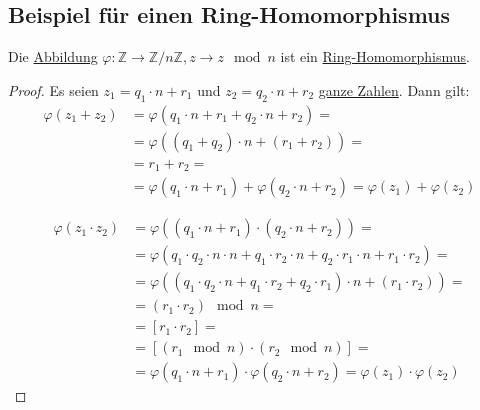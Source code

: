 \documentclass[../../main.tex]{subfiles}
\begin{document}
		\subsection*{Beispiel für einen Ring-Homomorphismus}
		\begin{theorem}
			Die \hyperref[def:Abbildung]{Abbildung} $\varphi: \mathbb{Z} \rightarrow \mathbb{Z}/n\mathbb{Z}, z \rightarrow z \mod n$ ist ein \hyperref[def:RingHomomorphismus]{Ring-Homomorphismus}.
			\begin{proof}
				Es seien $z_1 = q_1 \cdot n + r_1$ und $z_2 = q_2 \cdot n + r_2$ \hyperref[def:GanzeZahlen]{ganze Zahlen}. Dann gilt:
				\begin{align*}
				\varphi(z_1 + z_2) &= \varphi(q_1 \cdot n + r_1 + q_2 \cdot n + r_2) = \\ 
				                   &= \varphi((q_1+q_2)\cdot n + (r_1 + r_2)) = \\ 
				                   &= r_1 + r_2 = \\ 
				                   &= \varphi(q_1 \cdot n + r_1) + \varphi(q_2 \cdot n + r_2) = \varphi(z_1) + \varphi(z_2)
				\end{align*}
				
				\begin{align*}
				\varphi(z_1 \cdot z_2) &= \varphi((q_1 \cdot n + r_1) \cdot (q_2 \cdot n + r_2)) = \\ 
				                       &= \varphi(q_1 \cdot q_2 \cdot n \cdot n + q_1 \cdot r_2 \cdot n + q_2 \cdot r_1 \cdot n + r_1 \cdot r_2) = \\ 
				                       &= \varphi((q_1 \cdot q_2 \cdot n + q_1 \cdot r_2 + q_2 \cdot r_1) \cdot n + (r_1 \cdot r_2)) = \\ 
				                       &= (r_1 \cdot r_2) \mod n = \\ 
				                       &= [r_1 \cdot r_2] = \\ 
				                       &= [(r_1 \mod n) \cdot (r_2 \mod n)] = \\
				                       &= \varphi(q_1 \cdot n + r_1) \cdot \varphi(q_2 \cdot n + r_2) = \varphi(z_1) \cdot \varphi(z_2)
				\end{align*}
			\end{proof}
		\end{theorem}
\end{document}
